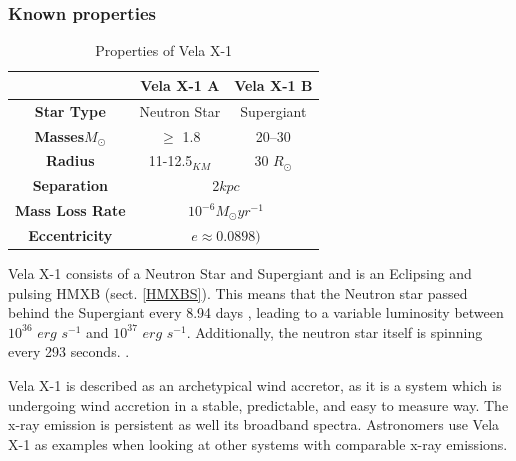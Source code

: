 \documentclass[12pt, letterpaper]{article}
\begin{document}
    \begin{table}
            \subsubsection{Known properties}
            \begin{center}
                \begin{tabular}{||c | c  c||} 
                 \hline
                 & Vela X-1 A & Vela X-1 B  \\ 
                 \hline\hline
                 \textbf{Star Type} & Neutron Star & Supergiant \cite{Kretschmar_2021} \\ 
                 \hline
                 \textbf{Masses}\(M_\odot\) & $\ge$ 1.8 \cite{Kretschmar_2021} & 20–30 \cite{Kretschmar_2021} \\
                 \hline
                 \textbf{Radius} & 11-12.5$_{KM}$ \cite{Kretschmar_2021} & 30 \(R_\odot\)
                 \cite{Kretschmar_2021} \\ %
                 \hline 
                 \textbf{Separation} &  \multicolumn{2}{c||}{2$kpc$ \cite{Kretschmar_2021}} \\
                 \hline 
                 \textbf{Mass Loss Rate} & \multicolumn{2}{c||}{$10^{-6} M_\odot yr^{-1}$ \cite{Kretschmar_2021}} \\
                 \hline
                 \textbf{Eccentricity} & \multicolumn{2}{c||}{$ e \approx  0.0898)$ \cite{Kretschmar_2021}} \\
                 \hline
                \end{tabular}
                \caption{Properties of Vela X-1} 
                \label{VelaX1} 
            \end{center}
    \end{table}

        Vela X-1 consists of a Neutron Star and Supergiant and is an Eclipsing and pulsing HMXB (sect. \ref{HMXBS}). This means that the Neutron star passed behind the Supergiant every 8.94 days \cite{Falanga_2015}, leading to a variable luminosity between $10^{36}$ $erg$ $s^{-1}$ and $10^{37}$ $erg$ $s^{-1}$. Additionally, the neutron star itself is spinning every 293 seconds. \cite{Kretschmar_2021}. 
        
        Vela X-1 is described as an archetypical wind accretor, as it is a system which is undergoing wind accretion in a stable, predictable, and easy to measure way. The x-ray emission is persistent as well its broadband spectra. Astronomers use Vela X-1 as examples when looking at other systems with comparable x-ray emissions. \cite{Kretschmar_2021}
        
\end{document}
